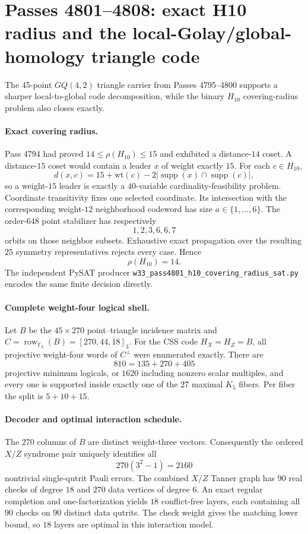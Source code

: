 \section{Passes 4801--4808: exact H10 radius and the local-Golay/global-homology triangle code}
\label{sec:pass4801-4808}

The 45-point $GQ(4,2)$ triangle carrier from Passes 4795--4800 supports a sharper local-to-global code decomposition, while the binary $H_{10}$ covering-radius problem also closes exactly.

\paragraph{Exact covering radius.}
Pass 4794 had proved $14\le \rho(H_{10})\le 15$ and exhibited a distance-$14$ coset.  A distance-$15$ coset would contain a leader $x$ of weight exactly $15$.  For each $c\in H_{10}$,
\[
 d(x,c)=15+\mathrm{wt}(c)-2|\operatorname{supp}(x)\cap\operatorname{supp}(c)|,
\]
so a weight-$15$ leader is exactly a $40$-variable cardinality-feasibility problem.  Coordinate transitivity fixes one selected coordinate.  Its intersection with the corresponding weight-$12$ neighborhood codeword has size $a\in\{1,\ldots,6\}$.  The order-$648$ point stabilizer has respectively
\[
1,2,3,6,6,7
\]
orbits on those neighbor subsets.  Exhaustive exact propagation over the resulting $25$ symmetry representatives rejects every case.  Hence
\[
\boxed{\rho(H_{10})=14.}
\]
The independent PySAT producer \texttt{w33\_pass4801\_h10\_covering\_radius\_sat.py} encodes the same finite decision directly.

\paragraph{Complete weight-four logical shell.}
Let $B$ be the $45\times270$ point--triangle incidence matrix and $C=\operatorname{row}_{\mathbb F_3}(B)=[270,44,18]_3$.  For the CSS code $H_X=H_Z=B$, all projective weight-four words of $C^\perp$ were enumerated exactly.  There are
\[
810=135+270+405
\]
projective minimum logicals, or $1620$ including nonzero scalar multiples, and every one is supported inside exactly one of the $27$ maximal $K_5$ fibers.  Per fiber the split is $5+10+15$.

\paragraph{Decoder and optimal interaction schedule.}
The $270$ columns of $B$ are distinct weight-three vectors.  Consequently the ordered $X/Z$ syndrome pair uniquely identifies all
\[
270(3^2-1)=2160
\]
nontrivial single-qutrit Pauli errors.  The combined $X/Z$ Tanner graph has $90$ real checks of degree $18$ and $270$ data vertices of degree $6$.  An exact regular completion and one-factorization yields $18$ conflict-free layers, each containing all $90$ checks on $90$ distinct data qutrits.  The check weight gives the matching lower bound, so $18$ layers are optimal in this interaction model.


